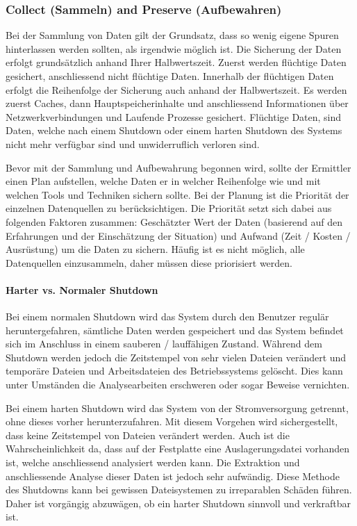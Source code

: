\subsubsection{Collect (Sammeln) and Preserve (Aufbewahren)} \label{subsubsec:FA:Secure:CollectPreserve}
Bei der Sammlung von Daten gilt der Grundsatz, dass so wenig eigene Spuren hinterlassen werden sollten, als irgendwie möglich ist. Die Sicherung der Daten erfolgt grundsätzlich anhand Ihrer Halbwertszeit. Zuerst werden flüchtige Daten gesichert, anschliessend nicht flüchtige Daten. Innerhalb der flüchtigen Daten erfolgt die Reihenfolge der Sicherung auch anhand der Halbwertszeit. Es werden zuerst Caches, dann Hauptspeicherinhalte und anschliessend Informationen über Netzwerkverbindungen und Laufende Prozesse gesichert. Flüchtige Daten, sind Daten, welche nach einem Shutdown oder einem harten Shutdown des Systems nicht mehr verfügbar sind und unwiderruflich verloren sind.

Bevor mit der Sammlung und Aufbewahrung begonnen wird, sollte der Ermittler einen Plan aufstellen, welche Daten er in welcher Reihenfolge wie und mit welchen Tools und Techniken sichern sollte. Bei der Planung ist die Priorität der einzelnen Datenquellen zu berücksichtigen. Die Priorität setzt sich dabei aus folgenden Faktoren zusammen: Geschätzter Wert der Daten (basierend auf den Erfahrungen und der Einschätzung der Situation) und Aufwand (Zeit / Kosten / Ausrüstung) um die Daten zu sichern. Häufig ist es nicht möglich, alle Datenquellen einzusammeln, daher müssen diese priorisiert werden.

\paragraph{Harter vs. Normaler Shutdown}
Bei einem normalen Shutdown wird das System durch den Benutzer regulär heruntergefahren, sämtliche Daten werden gespeichert und das System befindet sich im Anschluss in einem sauberen / lauffähigen Zustand. Während dem Shutdown werden jedoch die Zeitstempel von sehr vielen Dateien verändert und temporäre Dateien und Arbeitsdateien des Betriebssystems gelöscht. Dies kann unter Umständen die Analysearbeiten erschweren oder sogar Beweise vernichten. 

Bei einem harten Shutdown wird das System von der Stromversorgung getrennt, ohne dieses vorher herunterzufahren. Mit diesem Vorgehen wird sichergestellt, dass keine Zeitstempel von Dateien verändert werden. Auch ist die Wahrscheinlichkeit da, dass auf der Festplatte eine Auslagerungsdatei vorhanden ist, welche anschliessend analysiert werden kann. Die Extraktion und anschliessende Analyse dieser Daten ist jedoch sehr aufwändig. Diese Methode des Shutdowns kann bei gewissen Dateisystemen zu irreparablen Schäden führen. Daher ist vorgängig abzuwägen, ob ein harter Shutdown sinnvoll und verkraftbar ist.

